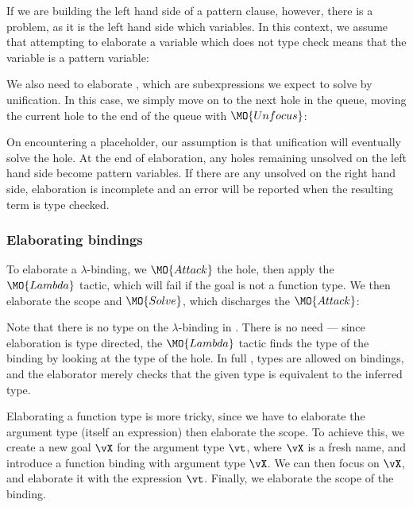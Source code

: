 If we are building the left hand side of a pattern clause, however, there is a
problem, as it is the left hand side which  variables. In this
context, we assume that attempting to elaborate a variable which does not type
check means that the variable is a pattern variable:


We also need to elaborate , which are subexpressions we expect to
solve by unification. In this case, we simply move on to the next hole in the queue, moving
the current hole to the end of the queue with $\MO{Unfocus}$:


On encountering a placeholder, our assumption is that unification will
eventually solve the hole. At the end of elaboration, any holes remaining
unsolved on the left hand side become pattern variables. If there are any
unsolved on the right hand side, elaboration is incomplete and an error will
be reported when the resulting term is type checked.

\subsubsection{Elaborating bindings}

To elaborate a $\lambda$-binding, we $\MO{Attack}$ the hole, then apply the
$\MO{Lambda}$ tactic, which will fail if the goal is not a function type. We
then elaborate the scope and $\MO{Solve}$, which discharges the $\MO{Attack}$:


Note that there is no type on the $\lambda$-binding in \IdrisM{}. There is no need --- since
elaboration is type directed, the $\MO{Lambda}$ tactic finds the type of the binding by
looking at the type of the hole. In full \Idris{}, types are allowed on bindings, and the
elaborator merely checks that the given type is equivalent to the inferred type.

Elaborating a function type is more tricky, since we have to elaborate the argument
type (itself an \IdrisM{} expression) then elaborate the scope. To achieve this, we
create a new goal $\vX$ for the argument type $\vt$, where $\vX$ is a fresh name,
and introduce a function binding with argument type $\vX$. We can then focus on
$\vX$, and elaborate it with the expression $\vt$. Finally, we elaborate the
scope of the binding.

